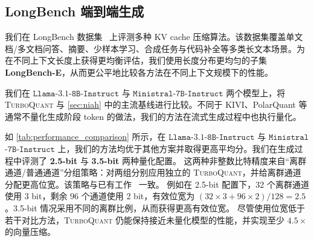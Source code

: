 \documentclass[11pt]{ctexart}
\def\llama{$\mathtt{Llama}$-$\mathtt{3.1}$-$\mathtt{8B}$-$\mathtt{Instruct}$}
\def\mistral{$\mathtt{Ministral}$-$\mathtt{7B}$-$\mathtt{Instruct}$}
\newcommand{\TurboQuant}{\textsc{TurboQuant}\xspace}
\let\cref\ref
\begin{document}
\subsection{LongBench 端到端生成}
\label{sec:exp_kv_end2end}

我们在 LongBench 数据集~\cite{bai2023longbench} 上评测多种 KV cache 压缩算法。该数据集覆盖单文档/多文档问答、摘要、少样本学习、合成任务与代码补全等多类长文本场景。为在不同上下文长度上获得更均衡评估，我们使用长度分布更均匀的子集 \textbf{LongBench-E}，从而更公平地比较各方法在不同上下文规模下的性能。

我们在 \llama{} 与 \mistral{} 两个模型上，将 \TurboQuant 与 \cref{sec:niah} 中的主流基线进行比较。不同于 KIVI、PolarQuant 等通常不量化生成阶段 token 的做法，我们的方法在流式生成过程中也执行量化。

如 \cref{tab:performance_comparison} 所示，在 \llama{} 与 \mistral{} 上，我们的方法均优于其他方案并取得更高平均分。我们在生成过程中评测了 \textbf{2.5-bit} 与 \textbf{3.5-bit} 两种量化配置。
这两种非整数比特精度来自“离群通道/普通通道”分组策略：对两组分别应用独立的 \TurboQuant，并给离群通道分配更高位宽。该策略与已有工作~\cite{zandieh2024qjl, su2025rotatekvaccuraterobust2bit} 一致。
例如在 2.5-bit 配置下，32 个离群通道使用 3 bit，剩余 96 个通道使用 2 bit，有效位宽为 \( (32 \times 3 + 96 \times 2) / 128 = 2.5 \)。3.5-bit 情况采用不同的离群比例，从而获得更高有效位宽。
尽管使用位宽低于若干对比方法，\TurboQuant 仍能保持接近未量化模型的性能，并实现至少 $4.5\times$ 的向量压缩。



\end{document}
